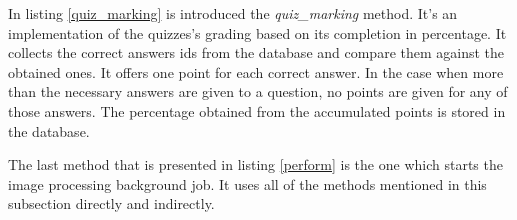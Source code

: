 

In listing \ref{quiz_marking} is introduced the \textit{quiz\_marking} method. It's an implementation of the quizzes's grading based on its completion in percentage. It collects the correct answers ids from the database and compare them against the obtained ones. It offers one point for each correct answer. In the case when more than the necessary answers are given to a question, no points are given for any of those answers. The percentage obtained from the accumulated points is stored in the database.





The last method that is presented in listing \ref{perform} is the one which starts the image processing background job. It uses all of the methods mentioned in this subsection directly and indirectly.




\clearpage